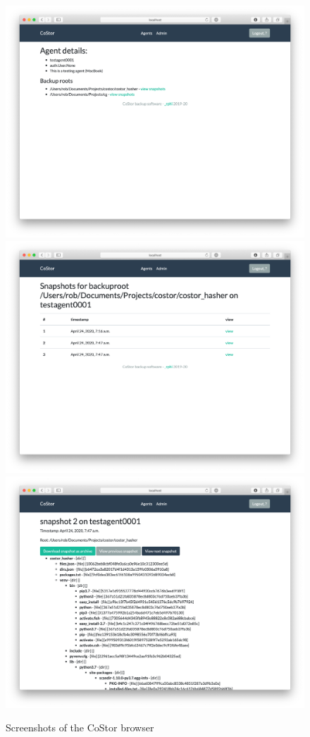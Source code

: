 \documentclass[bsc,frontabs,twoside,singlespacing,parskip,deptreport]{infthesis}     %
\begin{document}
\begin{figure}
	\includegraphics[width=0.75\linewidth]{img/screenshots/agent}
	\includegraphics[width=0.75\linewidth]{img/screenshots/snapshots}
	\includegraphics[width=0.75\linewidth]{img/screenshots/snapshot}
	\caption{Screenshots of the CoStor browser}
	\label{fig:browser}
\end{figure}
\end{document}
